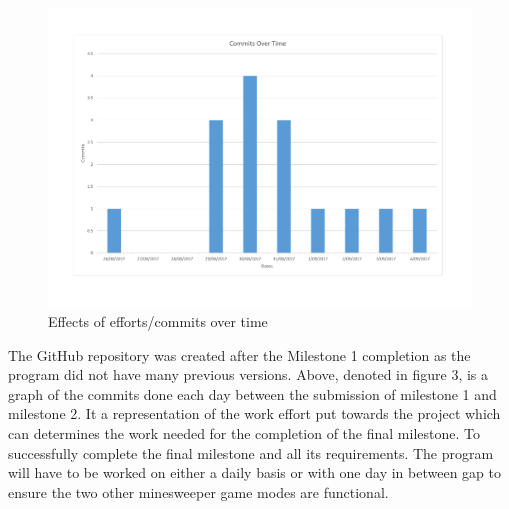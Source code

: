 \documentclass[12pt, a4]{report}
\begin{document}
\pagebreak
	\begin{figure}[!h]
		\centering
		\includegraphics[scale=0.6]{git}
		\caption{Effects of efforts/commits over time}
	\end{figure}
	\par 	The GitHub repository was created after the Milestone 1 completion as the program did not have many previous versions. Above, denoted in figure 3, is a graph of the commits done each day between the submission of milestone 1 and milestone 2. It a representation of the work effort put towards the project which can determines the work needed for the completion of the final milestone. To successfully complete the final milestone and all its requirements. The program will have to be worked on either a daily basis or with one day in between gap to ensure the two other minesweeper game modes are functional.
	
	\pagebreak
	

	
\end{document}
